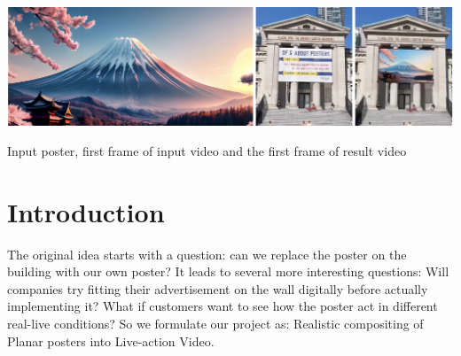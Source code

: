 \documentclass[sigconf]{acmart}
\begin{document}




\begin{teaserfigure}
  \includegraphics[width=\linewidth]{fig/figure2.png}
  \caption{Input poster, first frame of input video and the first frame of result video}
  \label{fig:teaser}
\end{teaserfigure}




\maketitle




\section{Introduction}

The original idea starts with a question: can we replace the poster on the building with our own poster? It leads to several more interesting questions: Will companies try fitting their advertisement on the wall digitally before actually implementing it? What if customers want to see how the poster act in different real-live conditions? So we formulate our project as: Realistic compositing of Planar posters into Live-action Video.
\end{document}
